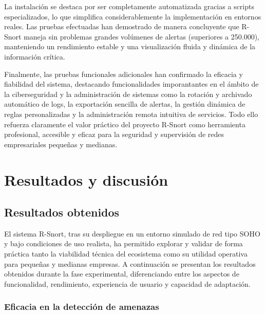 \documentclass[11pt,a4paper,twoside]{report}
\begin{document}
La instalación se destaca por ser completamente automatizada gracias a scripts especializados, lo que simplifica considerablemente la implementación en entornos reales. Las pruebas efectuadas han demostrado de manera concluyente que R-Snort maneja sin problemas grandes volúmenes de alertas (superiores a 250.000), manteniendo un rendimiento estable y una visualización fluida y dinámica de la información crítica.\newline

Finalmente, las pruebas funcionales adicionales han confirmado la eficacia y fiabilidad del sistema, destacando funcionalidades imporantantes en el ámbito de la ciberseguridad y la administración de sistemas como la rotación y archivado automático de logs, la exportación sencilla de alertas, la gestión dinámica de reglas personalizadas y la administración remota intuitiva de servicios. Todo ello refuerza claramente el valor práctico del proyecto R-Snort como herramienta profesional, accesible y eficaz para la seguridad y supervisión de redes empresariales pequeñas y medianas.






\clearpage
\null
\thispagestyle{empty}
\newpage
\chapter{Resultados y discusión}

\section{Resultados obtenidos}

El sistema R-Snort, tras su despliegue en un entorno simulado de red tipo SOHO y bajo condiciones de uso realista, ha permitido explorar y validar de forma práctica tanto la viabilidad técnica del ecosistema como su utilidad operativa para pequeñas y medianas empresas. A continuación se presentan los resultados obtenidos durante la fase experimental, diferenciando entre los aspectos de funcionalidad, rendimiento, experiencia de usuario y capacidad de adaptación.

\subsection{Eficacia en la detección de amenazas}
\end{document}
